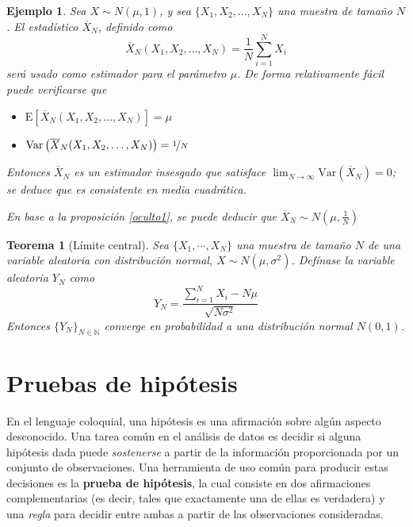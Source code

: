 \documentclass[12pt,letterpaper]{book}
\newtheorem{teorema}{Teorema}[chapter]
\newtheorem{ejemplo}{Ejemplo}[chapter]
\newcommand{\N}{\mathbb{N}}
\newcommand{\E}[1]{\mathrm{E}\left[ #1 \right]}
\newcommand{\Var}[1]{\mathrm{Var}\left( #1 \right)}
\begin{document}
\begin{ejemplo}
Sea $X\sim N(\mu,1)$, y sea $\{ X_1, X_2, \dots, X_N \}$ una muestra de tamaño $N$. El estadístico $\overline{X}_N$, definido como
\begin{equation}
\overline{X}_N (X_1,X_2,\dots,X_N) = \frac{1}{N} \sum_{i=1}^N X_i
\end{equation}
será usado como estimador para el parámetro $\mu$.
%
De forma relativamente fácil puede verificarse que
\begin{itemize}
\item $\E{\overline{X}_N (X_1,X_2,\dots,X_N)} = \mu$
\item $\Var{\overline{X}_N (X_1,X_2,\dots,X_N)} = \nicefrac{1}{N}$
\end{itemize}

Entonces $\overline{X}_N$ es un estimador insesgado que satisface $\lim_{N\rightarrow\infty} \Var{\overline{X}_N}=0$; se deduce que es consistente en media cuadrática.

En base a la proposición \ref{oculto1}, se puede deducir que $\overline{X}_N \sim N\left(\mu,\frac{1}{N}\right)$
\end{ejemplo}

\begin{teorema}[Límite central]
Sea $\{ X_1, \cdots, X_N\}$ una muestra de tamaño $N$ de una variable aleatoria con distribución normal, $X\sim N(\mu,\sigma^{2})$. Defínase la variable aleatoria $Y_N$ como
\begin{equation}
Y_N = \frac{\sum_{i=1}^{N}X_i - N \mu}{\sqrt{N \sigma^{2}}}
\end{equation}
Entonces $\{ Y_N \}_{N \in \N}$ converge en probabilidad a una distribución normal $N(0,1)$.
\end{teorema}



\section{Pruebas de hipótesis}


En el lenguaje coloquial, una hipótesis es una afirmación sobre algún aspecto desconocido.
%
Una tarea común en el análisis de datos es decidir si alguna hipótesis dada puede \textit{sostenerse} a partir de la información proporcionada por un conjunto de observaciones. 
%
%
Una herramienta de uso común para producir estas decisiones es la \textbf{prueba de hipótesis}, la cual consiste en dos afirmaciones complementarias (es decir, tales que exactamente una de ellas es verdadera) y una \textit{regla} para decidir entre ambas a partir de las observaciones consideradas.
\end{document}
